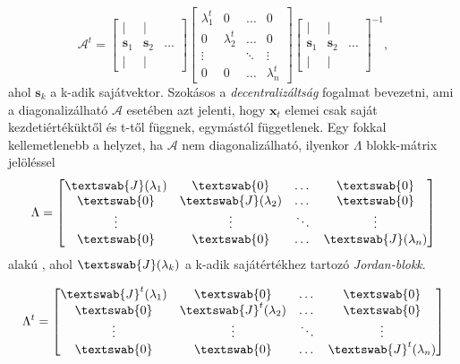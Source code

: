 \documentclass[14p]{article}
\begin{document}
\[
	\mathcal{A}^t =
	\begin{bmatrix}
		\mid & \mid \\
		\pmb{s}_1 & \pmb{s}_2 & \dots \\
		\mid & \mid
	\end{bmatrix}
	\begin{bmatrix}
		\lambda^{t}_1 & 0 & \dots & 0 \\
		0 & \lambda^{t}_2 & \dots & 0 \\
		\vdots & & \ddots & \vdots \\
		0 & 0 & \dots & \lambda^{t}_n
	\end{bmatrix}
	\begin{bmatrix}
		\mid & \mid \\
		\pmb{s}_1 & \pmb{s}_2 & \dots \\
		\mid & \mid
	\end{bmatrix}
	^{-1},
\]
ahol $\pmb{s}_k$ a k-adik sajátvektor.
Szokásos a \emph{decentralizáltság} fogalmat bevezetni, ami a diagonalizálható $\mathcal{A}$ esetében azt jelenti, hogy $\pmb{x}_t$ elemei csak saját kezdetiértéküktől és t-től függnek, egymástól függetlenek.
Egy fokkal kellemetlenebb a helyzet, ha $\mathcal{A}$ nem diagonalizálható, ilyenkor $\Lambda$ blokk-mátrix jelöléssel
\[
		\Lambda = 
			\begin{bmatrix}
			\textswab{J}(\lambda_1) & \textswab{0} & \dots & \textswab{0} \\
			\textswab{0} & \textswab{J}(\lambda_2) & \dots & \textswab{0} \\
			\vdots & \vdots & \ddots & \vdots \\
			\textswab{0} & \textswab{0} & \dots & \textswab{J}(\lambda_n)
			\end{bmatrix}
\]
alakú
\footnotemark{}
, ahol $\textswab{J}(\lambda_k)$ a k-adik sajátértékhez tartozó \emph{Jordan-blokk}\footnotemark{}.

\[
		\Lambda^t = 
		\begin{bmatrix}
		\textswab{J}^t(\lambda_1) & \textswab{0} & \dots & \textswab{0} \\
		\textswab{0} & \textswab{J}^t(\lambda_2) & \dots & \textswab{0} \\
		\vdots & \vdots & \ddots & \vdots \\
		\textswab{0} & \textswab{0} & \dots & \textswab{J}^t(\lambda_n)
		\end{bmatrix}		
\]
	
\end{document}
